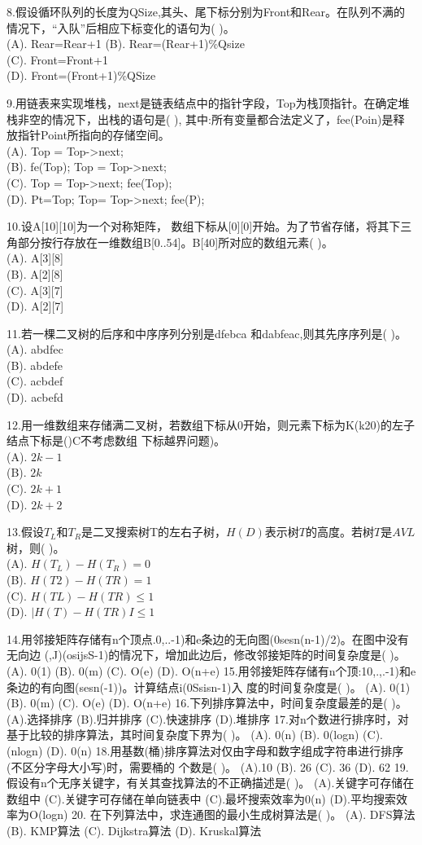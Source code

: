 8.假设循环队列的长度为QSize,其头、尾下标分别为Front和Rear。在队列不满的情况下，“入队”后相应下标变化的语句为( )。 \\
(A). Rear=Rear+1
(B). Rear=(Rear+1)\%Qsize \\
(C). Front=Front+1 \\
(D). Front=(Front+1)\%QSize

9.用链表来实现堆栈，next是链表结点中的指针字段，Top为栈顶指针。在确定堆栈非空的情况下，出栈的语句是( ), 其中:所有变量都合法定义了，fee(Poin)是释 放指针Point所指向的存储空间。  \\
(A). Top = Top->next; \\
(B). fe(Top); Top = Top->next; \\
(C). Top = Top->next; fee(Top); \\
(D). Pt=Top; Top= Top->next; fee(P);

10.设A[10][10]为一个对称矩阵， 数组下标从[0][0]开始。为了节省存储，将其下三角部分按行存放在一维数组B[0..54]。B[40]所对应的数组元素( )。 \\
(A). A[3][8] \\
(B). A[2][8] \\
(C). A[3][7] \\
(D). A[2][7]

11.若一棵二叉树的后序和中序序列分别是dfebca 和dabfeac,则其先序序列是( )。 \\
(A). abdfec \\
(B). abdefe \\
(C). acbdef \\
(D). acbefd

12.用一维数组来存储满二叉树，若数组下标从0开始，则元素下标为K(k20)的左子结点下标是()C不考虑数组 下标越界问题)。 \\
(A). $2k-1$ \\
(B). $2k$ \\
(C). $2k+1$ \\
(D). $2k+2$

13.假设$T_L$和$T_R$是二叉搜索树T的左右子树，$H(D)$表示树$T$的高度。若树$T$是$AVL$树，则( )。 \\
(A). $H(T_L)- H(T_R)= 0$ \\
(B). $H(T2)- H(TR)=1$ \\
(C). $H(TL)- H(TR)≤1$ \\
(D). $|H(T)- H(TR)I≤1$

14.用邻接矩阵存储有n个顶点.0,..-1)和e条边的无向图(0sesn(n-1)/2)。在图中没有无向边
(,J)(osijsS-1)的情况下，增加此边后，修改邻接矩阵的时间复杂度是( )。
(A). 0(1)
(B). 0(m)
(C). O(e)
(D). O(n+e)
15.用邻接矩阵存储有n个顶:10,.,.-1)和e条边的有向图(sesn(-1))。计算结点i(0Ssisn-1)入
度的时间复杂度是( )。
(A). 0(1)
(B). 0(m)
(C). O(e)
(D). O(n+e)
16.下列排序算法中，时间复杂度最差的是( )。
(A).选择排序
(B).归并排序
(C).快速排序
(D).堆排序
17.对n个数进行排序时，对基于比较的排序算法，其时间复杂度下界为( )。
(A). 0(n)
(B). 0(logn)
(C). (nlogn)
(D). 0(n)
18.用基数(桶)排序算法对仅由字母和数字组成字符串进行排序(不区分字母大小写)时，需要桶的
个数是( )。
(A).10
(B). 26
(C). 36
(D). 62
19.假设有n个无序关键字，有关其查找算法的不正确描述是( )。
(A).关键字可存储在数组中
(C).关键字可存储在单向链表中
(C).最坏搜索效率为0(n)
(D).平均搜索效率为O(logn)
20. 在下列算法中，求连通图的最小生成树算法是( )。
(A). DFS算法
(B). KMP算法
(C). Dijkstra算法
(D). Kruskal算法
